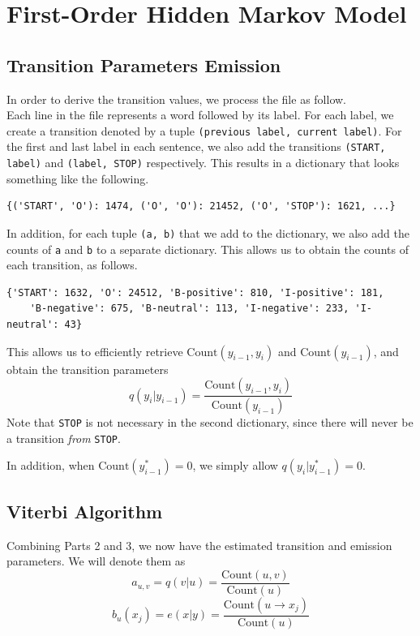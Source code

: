 \documentclass{article}
\numberwithin{equation}{section}
\begin{document}
\newpage
\section{First-Order Hidden Markov Model}
\subsection{Transition Parameters Emission}
In order to derive the transition values, we process the file as follow.\\
Each line in the file represents a word followed by its label. For each label, we create a transition denoted by a tuple \lstinline{(previous label, current label)}. For the first and last label in each sentence, we also add the transitions \lstinline{(START, label)} and \lstinline{(label, STOP)} respectively. This results in a dictionary that looks something like the following.

\begin{verbatim}
{('START', 'O'): 1474, ('O', 'O'): 21452, ('O', 'STOP'): 1621, ...}
\end{verbatim}

In addition, for each tuple \lstinline{(a, b)} that we add to the dictionary, we also add the counts of \lstinline{a} and \lstinline{b} to a separate dictionary. This allows us to obtain the counts of each transition, as follows.

\begin{verbatim}
{'START': 1632, 'O': 24512, 'B-positive': 810, 'I-positive': 181,
    'B-negative': 675, 'B-neutral': 113, 'I-negative': 233, 'I-neutral': 43}
\end{verbatim}

This allows us to efficiently retrieve $\text{Count}(y_{i-1}, y_i)$ and $\text{Count}(y_{i-1})$, and obtain the transition parameters
	$$q(y_i | y_{i-1}) = \frac{\text{Count}(y_{i-1}, y_i)}{\text{Count}(y_{i-1})}$$
Note that \lstinline{STOP} is not necessary in the second dictionary, since there will never be a transition \emph{from} \lstinline{STOP}.

In addition, when $\text{Count}(y^*_{i-1}) = 0$, we simply allow $q(y_i | y^*_{i-1}) = 0$.

\subsection{Viterbi Algorithm} \label{sec:viterbi}
Combining Parts 2 and 3, we now have the estimated transition and emission parameters. We will denote them as
	$$ a_{u, v} = q(v | u) = \frac{\text{Count}(u, v)}{\text{Count}(u)} $$
	$$ b_u(x_j) = e(x | y) = \frac{\text{Count}(u \rightarrow x_j)}{\text{Count}(u)} $$
\end{document}
